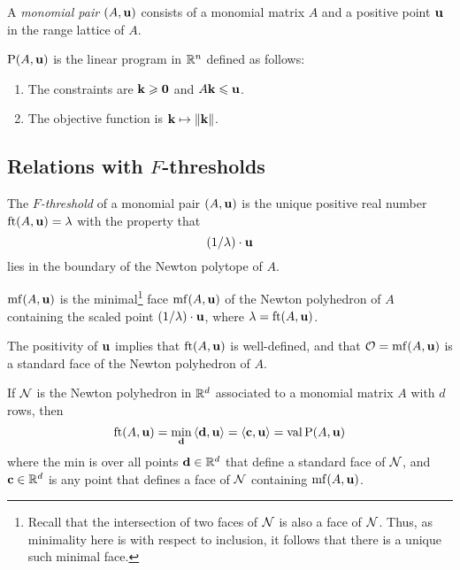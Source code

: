 \documentclass[11pt]{amsart}
\begin{document}
\begin{definition}
A \emph{monomial pair} $(A, \mathbf{u})$ consists of a monomial matrix $A$ and a positive point $\mathbf{u}$ in the range lattice of $A$.
\end{definition}


\begin{definition}
$\mathrm{P}(A, \mathbf{u})$ is the linear program in $\mathbb{R}^n$ defined as follows:
\begin{enumerate}
\item The constraints are $\mathbf{k} \geqslant \mathbf{0}$ and $A \mathbf{k} \leqslant \mathbf{u}$.
\item The objective function is $\mathbf{k} \mapsto \| \mathbf{k} \|$.
\end{enumerate}
\end{definition}




\subsection{Relations with $F$-thresholds}
\label{opt sets: SS}

\begin{definition}
The \emph{$F$-threshold} of a monomial pair $(A, \mathbf{u})$ is the unique positive real number $\operatorname{ft}(A, \mathbf{u}) = \lambda$ with the property that  \[ (1/\lambda)  \cdot \mathbf{u}  \] 
lies in the boundary of the Newton polytope of $A$.  
\end{definition}

\begin{definition}
$\operatorname{mf}(A, \mathbf{u})$ is the minimal\footnote{Recall that the intersection of two faces of $\mathcal{N}$ is also a face of $\mathcal{N}$. Thus, as minimality here is with respect to inclusion, it follows that there is a unique such minimal face.} face $\operatorname{mf}(A, \mathbf{u})$ of the Newton polyhedron of $A$ containing the scaled point $(1/\lambda) \cdot \mathbf{u}$, where $\lambda = \operatorname{ft}(A, \mathbf{u})$.
\end{definition}


\begin{remark}  The positivity of $\mathbf{u}$ implies that $\operatorname{ft}(A, \mathbf{u})$ is well-defined, and that $\mathcal{O} = \operatorname{mf}(A, \mathbf{u})$ is a standard face of the Newton polyhedron of $A$.
\end{remark}

\begin{proposition}
\label{FT descriptions: P}
  If $\mathcal{N}$ is the Newton polyhedron in $\mathbb{R}^d$ associated to a monomial matrix $A$ with $d$ rows, then
\[ \operatorname{ft}(A, \mathbf{u}) = \min_{\mathbf{d}} \, \langle \mathbf{d}, \mathbf{u} \rangle = \langle \mathbf{c}, \mathbf{u} \rangle = \operatorname{val} \mathrm{P}(A, \mathbf{u}) \] where the min is over all points $\mathbf{d} \in \mathbb{R}^d$ that define a standard face of $\mathcal{N}$, and $\mathbf{c} \in \mathbb{R}^d$ is any point that defines a face of $\mathcal{N}$ containing $\operatorname{mf}(A, \mathbf{u})$. 
\end{proposition}
\end{document}
